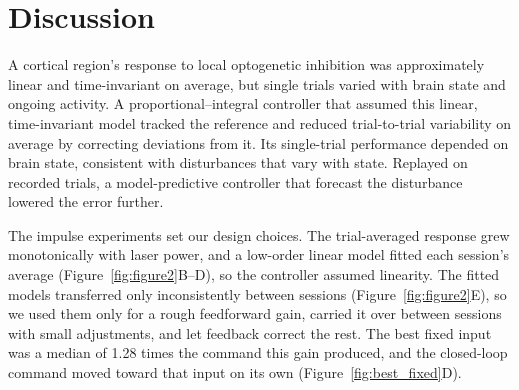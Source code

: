 \section*{Discussion}
A cortical region's response to local optogenetic inhibition was approximately linear and time-invariant on average, but single trials varied with brain state and ongoing activity.
A proportional--integral controller that assumed this linear, time-invariant model tracked the reference and reduced trial-to-trial variability on average by correcting deviations from it.
Its single-trial performance depended on brain state, consistent with disturbances that vary with state.
Replayed on recorded trials, a model-predictive controller that forecast the disturbance lowered the error further.

The impulse experiments set our design choices.
The trial-averaged response grew monotonically with laser power, and a low-order linear model fitted each session's average (Figure~\ref{fig:figure2}B--D), so the controller assumed linearity.
The fitted models transferred only inconsistently between sessions (Figure~\ref{fig:figure2}E), so we used them only for a rough feedforward gain, carried it over between sessions with small adjustments, and let feedback correct the rest.
The best fixed input was a median of 1.28 times the command this gain produced, and the closed-loop command moved toward that input on its own (Figure~\ref{fig:best_fixed}D).

